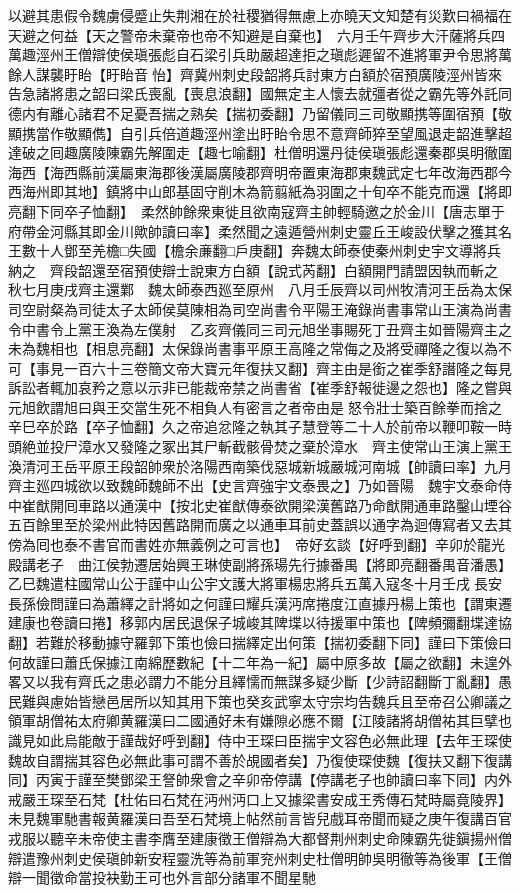 以避其患假令魏虜侵蹙止失荆湘在於社稷猶得無慮上亦曉天文知楚有災歎曰禍福在天避之何益【天之警帝未棄帝也帝不知避是自棄也】　六月壬午齊步大汗薩將兵四萬趣涇州王僧辯使侯瑱張彪自石梁引兵助嚴超達拒之瑱彪遲留不進將軍尹令思將萬餘人謀襲盱眙【盱眙音怡】齊冀州刺史段韶將兵討東方白額於宿預廣陵涇州皆來告急諸將患之韶曰梁氏喪亂【喪息浪翻】國無定主人懷去就彊者從之霸先等外託同德内有離心諸君不足憂吾揣之熟矣【揣初委翻】乃留儀同三司敬顯携等圍宿預【敬顯携當作敬顯儁】自引兵倍道趣涇州塗出盱眙令思不意齊師猝至望風退走韶進擊超達破之囘趣廣陵陳霸先解圍走【趣七喻翻】杜僧明還丹徒侯瑱張彪還秦郡吳明徹圍海西【海西縣前漢屬東海郡後漢屬廣陵郡齊明帝置東海郡東魏武定七年改海西郡今西海州即其地】鎮將中山郎基固守削木為箭翦紙為羽圍之十旬卒不能克而還【將即亮翻下同卒子恤翻】　柔然帥餘衆東徙且欲南寇齊主帥輕騎邀之於金川【唐志單于府帶金河縣其即金川歟帥讀曰率】柔然聞之遠遁營州刺史靈丘王峻設伏擊之獲其名王數十人鄧至羌檐□失國【檐余亷翻□戶庚翻】奔魏太師泰使秦州刺史宇文導將兵納之　齊段韶還至宿預使辯士說東方白額【說式芮翻】白額開門請盟因執而斬之　秋七月庚戌齊主還鄴　魏太師泰西廵至原州　八月壬辰齊以司州牧清河王岳為太保司空尉粲為司徒太子太師侯莫陳相為司空尚書令平陽王淹錄尚書事常山王演為尚書令中書令上黨王渙為左僕射　乙亥齊儀同三司元旭坐事賜死丁丑齊主如晉陽齊主之未為魏相也【相息亮翻】太保錄尚書事平原王高隆之常侮之及將受禪隆之復以為不可【事見一百六十三卷簡文帝大寶元年復扶又翻】齊主由是銜之崔季舒譖隆之每見訴訟者輒加哀矜之意以示非已能裁帝禁之尚書省【崔季舒報徙邊之怨也】隆之嘗與元旭飲謂旭曰與王交當生死不相負人有密言之者帝由是怒令壯士築百餘拳而捨之辛巳卒於路【卒子恤翻】久之帝追忿隆之執其子慧登等二十人於前帝以鞭叩鞍一時頭絶並投尸漳水又發隆之冢出其尸斬截骸骨焚之棄於漳水　齊主使常山王演上黨王渙清河王岳平原王段韶帥衆於洛陽西南築伐惡城新城嚴城河南城【帥讀曰率】九月齊主廵四城欲以致魏師魏師不出【史言齊強宇文泰畏之】乃如晉陽　魏宇文泰命侍中崔猷開囘車路以通漢中【按北史崔猷傳泰欲開梁漢舊路乃命猷開通車路鑿山堙谷五百餘里至於梁州此特因舊路開而廣之以通車耳前史蓋誤以通字為迴傳寫者又去其傍為囘也泰不書官而書姓亦無義例之可言也】　帝好玄談【好呼到翻】辛卯於龍光殿講老子　曲江侯勃遷居始興王琳使副將孫瑒先行據番禺【將即亮翻番禺音潘愚】　乙巳魏遣柱國常山公于謹中山公宇文護大將軍楊忠將兵五萬入寇冬十月壬戌長安長孫儉問謹曰為蕭繹之計將如之何謹曰耀兵漢沔席捲度江直據丹楊上策也【謂東遷建康也卷讀曰捲】移郭内居民退保子城峻其陴堞以待援軍中策也【陴頻彌翻堞達協翻】若難於移動據守羅郭下策也儉曰揣繹定出何策【揣初委翻下同】謹曰下策儉曰何故謹曰蕭氏保據江南綿歷數紀【十二年為一紀】屬中原多故【屬之欲翻】未遑外畧又以我有齊氏之患必謂力不能分且繹懦而無謀多疑少斷【少詩詔翻斷丁亂翻】愚民難與慮始皆戀邑居所以知其用下策也癸亥武寧太守宗均告魏兵且至帝召公卿議之領軍胡僧祐太府卿黄羅漢曰二國通好未有嫌隙必應不爾【江陵諸將胡僧祐其巨擘也識見如此烏能敵于謹哉好呼到翻】侍中王琛曰臣揣宇文容色必無此理【去年王琛使魏故自謂揣其容色必無此事可謂不善於覘國者矣】乃復使琛使魏【復扶又翻下復講同】丙寅于謹至樊鄧梁王詧帥衆會之辛卯帝停講【停講老子也帥讀曰率下同】内外戒嚴王琛至石梵【杜佑曰石梵在沔州沔口上又據梁書安成王秀傳石梵時屬竟陵界】未見魏軍馳書報黄羅漢曰吾至石梵境上帖然前言皆兒戲耳帝聞而疑之庚午復講百官戎服以聽辛未帝使主書李膺至建康徵王僧辯為大都督荆州刺史命陳霸先徙鎭揚州僧辯遣豫州刺史侯瑱帥新安程靈洗等為前軍兖州刺史杜僧明帥吳明徹等為後軍【王僧辯一聞徵命當投袂勤王可也外言部分諸軍不聞星馳